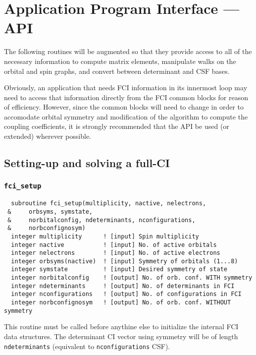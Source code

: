\section{Application Program Interface --- API}

The following routines will be augmented so that they provide access
to all of the necessary information to compute matrix elements,
manipulate walks on the orbital and spin graphs, and convert between
determinant and CSF bases. 

Obviously, an application that needs FCI information in its innermost
loop may need to access that information directly from the FCI common
blocks for reason of efficiency.  However, since the common blocks
will need to change in order to accomodate orbital symmetry and
modification of the algorithm to compute the coupling coefficients, it
is strongly recommended that the API be used (or extended) wherever
possible.

\subsection{Setting-up and solving a full-CI}

\subsubsection{{\tt fci\_setup}}

\begin{verbatim}
  subroutine fci_setup(multiplicity, nactive, nelectrons,
 &     orbsyms, symstate,
 &     norbitalconfig, ndeterminants, nconfigurations,
 &     norbconfignosym)
  integer multiplicity      ! [input] Spin multiplicity
  integer nactive           ! [input] No. of active orbitals
  integer nelectrons        ! [input] No. of active electrons
  integer orbsyms(nactive)  ! [input] Symmetry of orbitals (1...8)
  integer symstate          ! [input] Desired symmetry of state
  integer norbitalconfig    ! [output] No. of orb. conf. WITH symmetry
  integer ndeterminants     ! [output] No. of determinants in FCI
  integer nconfigurations   ! [output] No. of configurations in FCI
  integer norbconfignosym   ! [output] No. of orb. conf. WITHOUT symmetry
\end{verbatim}
This routine must be called before anythine else to initialize the
internal FCI data structures.  The determinant CI vector using
symmetry will be of length \verb+ndeterminants+ (equivalent to
\verb+nconfigurations+ CSF).

